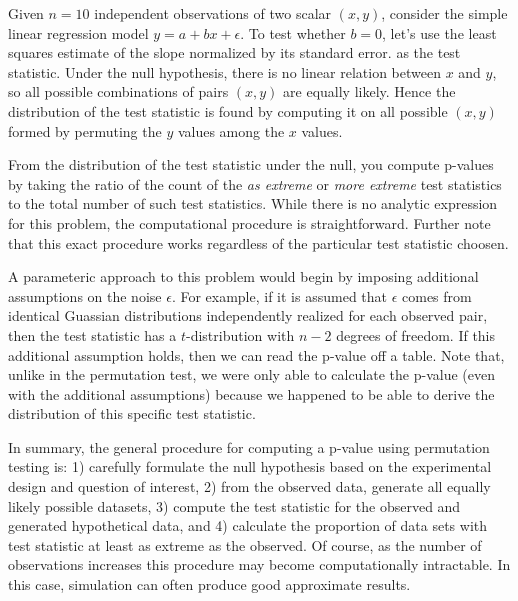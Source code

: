 \begin{exmp}
Given $n=10$ independent observations of two scalar $(x, y)$, consider the
simple linear regression model $y = a + bx + \epsilon$.  To test whether $b =
0$, let's use the least squares estimate of the slope normalized by its
standard error.  as the test statistic.  Under the null hypothesis, there is no
linear relation between $x$ and $y$, so all possible combinations of pairs
$(x,y)$ are equally likely.  Hence the distribution of the test statistic is
found by computing it on all possible $(x, y)$ formed by permuting the $y$
values among the $x$ values.

From the distribution of the test statistic under the null, you compute
p-values by taking the ratio of the count of the \emph{as extreme} or
\emph{more extreme} test statistics to the total number of such test
statistics. While there is no analytic expression for this problem, the
computational procedure is straightforward.  Further note that this exact
procedure works regardless of the particular test statistic choosen.

A parameteric approach to this problem would begin by imposing additional
assumptions on the noise $\epsilon$.  For example, if it is assumed that
$\epsilon$ comes from identical Guassian distributions independently realized
for each observed pair, then the test statistic has a $t$-distribution with
$n-2$ degrees of freedom.  If this additional assumption holds, then we can read
the p-value off a table.  Note that, unlike in the permutation test, we were
only able to calculate the p-value (even with the additional assumptions)
because we happened to be able to derive the distribution of this specific
test statistic. 
\end{exmp}

In summary, the general procedure for computing a p-value using permutation
testing is: 1) carefully formulate the null hypothesis based on the
experimental design and question of interest, 2) from the observed data,
generate all equally likely possible datasets, 3) compute the test statistic
for the observed and generated hypothetical data, and 4) calculate the
proportion of data sets with test statistic at least as extreme as the
observed.  Of course, as the number of observations increases this procedure
may become computationally intractable.  In this case, simulation can often
produce good approximate results.

